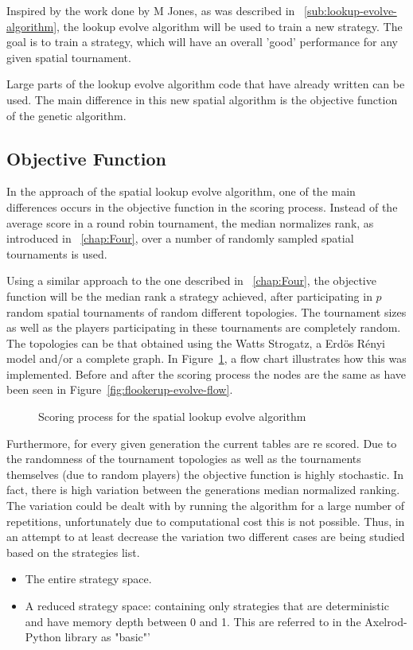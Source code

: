 Inspired by the work done by M Jones, as was described in ~\autoref{sub:lookup-evolve-algorithm},
the lookup evolve algorithm will be used to train a new strategy. The goal is to
train a strategy, which will have an overall 'good' performance for any given
spatial tournament.

Large parts of the lookup evolve algorithm code that have already written
can be used. The main difference in this new spatial algorithm is the objective
function of the genetic algorithm.
\subsection{Objective Function}

In the approach of the spatial lookup evolve algorithm, one of the main differences
occurs in the objective function in the scoring process. Instead of the average
score in a round robin tournament, the median normalizes rank, as introduced
in ~\autoref{chap:Four}, over a number of randomly sampled spatial tournaments
is used.

Using a similar approach to the one described in ~\autoref{chap:Four}, the objective
function will be the median rank a strategy achieved, after participating in \(p\)
random spatial tournaments of random different topologies. The tournament sizes
as well as the players participating in these tournaments are completely random.
The topologies can be that obtained using the Watts Strogatz, a Erd\"{o}s
R\'{e}nyi model and/or a complete graph. In Figure~\ref{fig:objective}, a flow chart
illustrates how this was implemented. Before and after the scoring
process the nodes are the same as have been seen in Figure~\ref{fig:flookerup-evolve-flow}.

\begin{figure}[!hbtp]
		
		\caption{Scoring process for the spatial lookup evolve algorithm}
  \label{fig:objective}
\end{figure}

Furthermore, for every given generation the current tables are re scored.
Due to the randomness of the tournament topologies as well as the tournaments
themselves (due to random players) the objective function is highly stochastic.
In fact, there is high variation between the generations median
normalized ranking. The variation could be dealt with by running the algorithm
for a large number of repetitions, unfortunately due to computational cost this
is not possible. Thus, in an attempt to at least decrease the variation two different
cases are being studied based on the strategies list.
\begin{itemize}
  \item The entire strategy space.
  \item A reduced strategy space: containing only strategies that are deterministic
        and have memory depth between 0 and 1. This are referred to in the
        Axelrod-Python library as "basic"'
\end{itemize}


